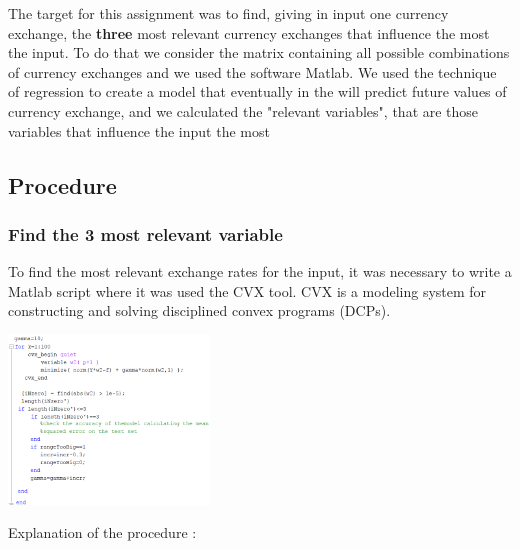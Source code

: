 \documentclass[sigconf]{acmart}
\begin{document}
The target for this assignment was to find, giving in input one currency exchange, the \textbf{three} most relevant currency exchanges that influence the most the input. To do that we consider the matrix containing all possible combinations of currency exchanges and we used the software Matlab. We used the technique of regression to create a model that eventually in the will predict future values of currency exchange, and we calculated the "relevant variables", that are those variables that influence the input the most 

\subsection{Procedure}
\subsubsection{Find the 3 most relevant variable \\}

To find the most relevant exchange rates for the input, it was necessary to write a Matlab script where it was used the CVX tool. CVX is a modeling system for constructing and solving disciplined convex programs (DCPs). {\cite{1}}

\includegraphics[width=0.4\textwidth]{ccc.png}

Explanation of the procedure : 
\end{document}
